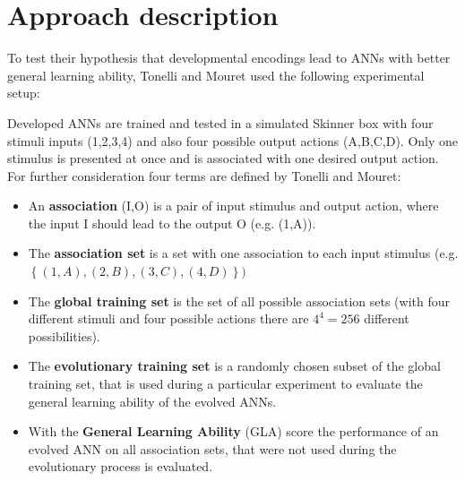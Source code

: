 \documentclass[12pt,twoside]{article}
\theoremstyle{plain}
\theoremstyle{definition}
\theoremstyle{remark}
\begin{document}

\section{Approach description}
\label{sec:model}
To test their hypothesis that developmental encodings lead to ANNs with better general learning ability, Tonelli and Mouret used the following experimental setup:\medskip

Developed ANNs are trained and tested in a simulated Skinner box with four stimuli inputs (1,2,3,4) and also four possible output actions (A,B,C,D). Only one stimulus is presented at once and is associated with one desired output action.
For further consideration four terms are defined by Tonelli and Mouret:
\begin{itemize}
	\item An \textbf{association} (I,O) is a pair of input stimulus and output action, where the input I should lead to the output O (e.g. (1,A)).
	\item The \textbf{association set} is a set with one association to each input stimulus (e.g. $\left\{(1,A),(2,B),(3,C),(4,D)\right\})$
	\item The \textbf{global training set} is the set of all possible association sets (with four different stimuli and four possible actions there are $4^4 = 256$ different possibilities).
	\item The \textbf{evolutionary training set} is a randomly chosen subset of the global training set, that is used during a particular experiment to evaluate the general learning ability of the evolved ANNs.
	\item With the \textbf{General Learning Ability} (GLA) score the performance of an evolved ANN on all association sets, that were not used during the evolutionary process is evaluated.
\end{itemize}
\end{document}

